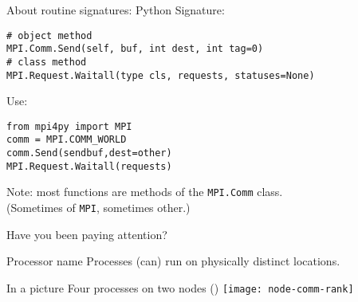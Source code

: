 \begin{python}
  \addtocounter{slidecount}{-1}
\begin{numberedframe}{About routine signatures: Python}
Signature:
\lstset{language=Python}
\begin{lstlisting}
# object method
MPI.Comm.Send(self, buf, int dest, int tag=0)
# class method
MPI.Request.Waitall(type cls, requests, statuses=None)
\end{lstlisting}
Use:
\begin{lstlisting}
from mpi4py import MPI
comm = MPI.COMM_WORLD
comm.Send(sendbuf,dest=other)
MPI.Request.Waitall(requests)
\end{lstlisting}
Note: most functions are methods of the \lstinline{MPI.Comm} class.\\
(Sometimes of \lstinline{MPI}, sometimes other.)
\end{numberedframe}
\end{python}

\begin{numberedframe}{Have you been paying attention?}
  
\end{numberedframe}

\begin{exerciseframe}[commrank]
  
\end{exerciseframe}

\begin{exerciseframe}[commrank]
  
\end{exerciseframe}

\begin{numberedframe}{Processor name}
  Processes (can) run on physically distinct locations.

\end{numberedframe}

\begin{numberedframe}{In a picture}
  Four processes on two nodes ()
  \texttt{[image: node-comm-rank]}
\end{numberedframe}

\begin{mpl}
\end{mpl}

\begin{exerciseframe}
  
\end{exerciseframe}


